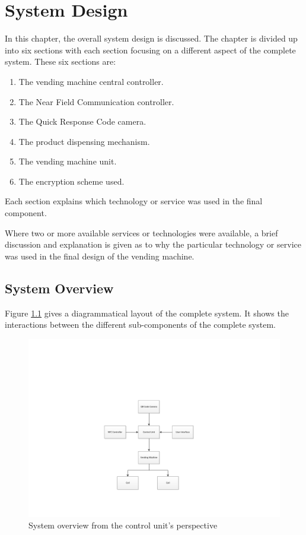 \chapter{System Design}

In this chapter, the overall system design is discussed. The chapter is divided up into 
six sections with each section focusing on a different aspect of the complete
system. These six sections are:

\begin{enumerate}
  \item The vending machine central controller.
  \item The Near Field Communication controller.
  \item The Quick Response Code camera.
  \item The product dispensing mechanism.
  \item The vending machine unit.
  \item The encryption scheme used.
\end{enumerate}

Each section explains which technology or service was used in the final
component.

Where two or more available services or technologies were available,
a brief discussion and explanation is given as to why the particular technology or
service was used in the final design of the vending machine.

\section{System Overview}

Figure \ref{fig:system-overview-pi} gives a diagrammatical layout of the complete system.
It shows the interactions between the different sub-components of the complete system.

\begin{figure}
\centering
\includegraphics[clip=true, trim = 100 80 0 150, scale=0.7]{pi_system_overview}
\caption{System overview from the control unit's perspective}
\label{fig:system-overview-pi}
\end{figure}

